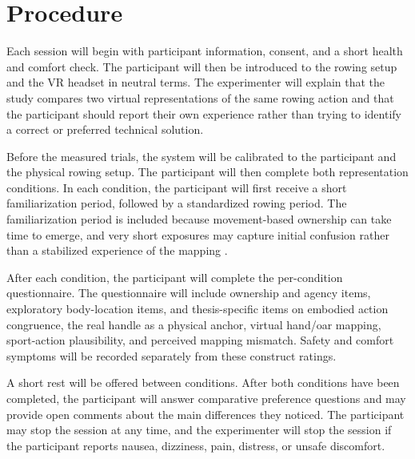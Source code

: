 \section{Procedure}
\label{sec:study_design_procedure}

Each session will begin with participant information, consent, and a short health and comfort check. The participant will then be introduced to the rowing setup and the VR headset in neutral terms. The experimenter will explain that the study compares two virtual representations of the same rowing action and that the participant should report their own experience rather than trying to identify a correct or preferred technical solution.

Before the measured trials, the system will be calibrated to the participant and the physical rowing setup. The participant will then complete both representation conditions. In each condition, the participant will first receive a short familiarization period, followed by a standardized rowing period. The familiarization period is included because movement-based ownership can take time to emerge, and very short exposures may capture initial confusion rather than a stabilized experience of the mapping \parencite{kalckertEhrsson2017ownershipOnset}.


After each condition, the participant will complete the per-condition questionnaire. The questionnaire will include ownership and agency items, exploratory body-location items, and thesis-specific items on embodied action congruence, the real handle as a physical anchor, virtual hand/oar mapping, sport-action plausibility, and perceived mapping mismatch. Safety and comfort symptoms will be recorded separately from these construct ratings.

A short rest will be offered between conditions. After both conditions have been completed, the participant will answer comparative preference questions and may provide open comments about the main differences they noticed. The participant may stop the session at any time, and the experimenter will stop the session if the participant reports nausea, dizziness, pain, distress, or unsafe discomfort.
